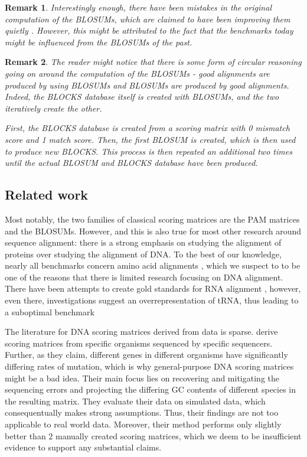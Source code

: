 \documentclass{article}
\newtheorem{remark}{Remark}
\begin{document}
\begin{remark}
Interestingly enough, there have been
mistakes in the original computation of the BLOSUMs, which are claimed
to have been improving them quietly
\cite{styczynskiBLOSUM62MiscalculationsImprove2008a}. However, this might be
attributed to the fact that the benchmarks today might be influenced from the BLOSUMs of the past.
\end{remark}

\begin{remark} \label{emref}
	The reader might notice that there is some form of circular reasoning going on around
	the computation of the BLOSUMs - good alignments are produced by using BLOSUMs 
	and BLOSUMs are produced by good alignments. Indeed, the BLOCKS database
	itself is created with BLOSUMs, and the two iteratively create the other.

	First, the BLOCKS database is created from a scoring matrix with 0
	mismatch score and 1 match score. Then, the first BLOSUM is created,
	which is then used to produce new BLOCKS. This process is then repeated 
 	an additional two times until the actual BLOSUM and BLOCKS database have been
	produced.
\end{remark}

\subsection{Related work}
Most notably, the two families of classical scoring matrices are the PAM matrices \cite{dayhoffModelEvolutionaryChange1978} and the BLOSUMs. 
However, and this is also true for most other research around sequence alignment: there is a strong emphasis on studying the
alignment of proteins over studying the alignment of DNA. To the best of our
knowledge, nearly all benchmarks concern amino acid alignments \cite{gardnerBenchmarkMultipleSequence2005, pervezEvaluatingAccuracyEfficiency2014, thompsonBAliBASELatestDevelopments2005, vanwalleSABmarkBenchmarkSequence2005a}, which
we suspect to to be one of the reasons that there is limited research focusing
on DNA alignment. There have been attempts to create gold standards for RNA
alignment \cite{wilmEnhancedRNAAlignment2006},
however, even there, investigations suggest an overrepresentation of tRNA, thus
leading to a suboptimal benchmark \cite{lowesBRaliBaseDentTale2017}

The literature for DNA scoring matrices derived from data is sparse.
\textcite{hamadaTrainingAlignmentParameters2017} derive scoring matrices from
specific organisms sequenced by specific sequencers. Further, as they claim,
different genes in different organisms have significantly differing rates of
mutation, which is why general-purpose DNA scoring matrices might be a bad
idea. Their main focus lies on recovering and mitigating the sequencing errors
and projecting the differing GC contents of different species in the resulting
matrix. They evaluate their data on simulated data, which consequentually makes
strong assumptions. Thus, their findings are not  too applicable to real world data.
Moreover, their method performs only slightly better than 2 manually created scoring matrices, which we deem to be insufficient evidence to support any substantial claims.
\end{document}
